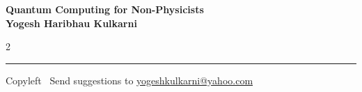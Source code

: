 \documentclass[8pt,landscape]{article}
\begin{document}
\footnotesize

\begin{center}
\Large{\textbf{Quantum Computing for Non-Physicists\\ Yogesh Haribhau Kulkarni}}
\end{center}

\begin{multicols}{2}

\end{multicols}

\rule{\linewidth}{0.25pt}
\scriptsize
Copyleft \textcopyleft\  Send suggestions to
\href{http://www.yogeshkulkarni.com}{yogeshkulkarni@yahoo.com}
\end{document}
